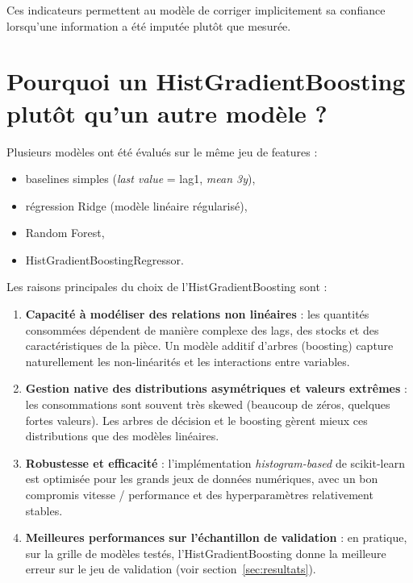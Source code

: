 \documentclass[11pt,a4paper]{article}
\begin{document}
Ces indicateurs permettent au modèle de corriger implicitement sa confiance lorsqu'une information a été imputée plutôt que mesurée.

\section{Pourquoi un HistGradientBoosting plutôt qu'un autre modèle ?}

Plusieurs modèles ont été évalués sur le même jeu de features :

\begin{itemize}
  \item baselines simples (\emph{last value} = lag1, \emph{mean 3y}),
  \item régression Ridge (modèle linéaire régularisé),
  \item Random Forest,
  \item HistGradientBoostingRegressor.
\end{itemize}

Les raisons principales du choix de l'HistGradientBoosting sont :

\begin{enumerate}
  \item \textbf{Capacité à modéliser des relations non linéaires} : les quantités consommées dépendent de manière complexe des lags, des stocks et des caractéristiques de la pièce. Un modèle additif d'arbres (boosting) capture naturellement les non-linéarités et les interactions entre variables.

  \item \textbf{Gestion native des distributions asymétriques et valeurs extrêmes} : les consommations sont souvent très skewed (beaucoup de zéros, quelques fortes valeurs). Les arbres de décision et le boosting gèrent mieux ces distributions que des modèles linéaires.

  \item \textbf{Robustesse et efficacité} : l'implémentation \emph{histogram-based} de scikit-learn est optimisée pour les grands jeux de données numériques, avec un bon compromis vitesse / performance et des hyperparamètres relativement stables.

  \item \textbf{Meilleures performances sur l'échantillon de validation} : en pratique, sur la grille de modèles testés, l'HistGradientBoosting donne la meilleure erreur sur le jeu de validation (voir section~\ref{sec:resultats}).
\end{enumerate}
\end{document}
